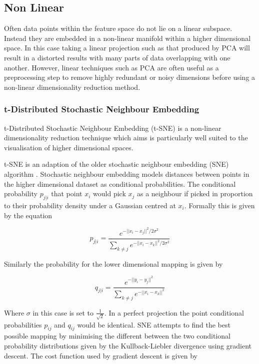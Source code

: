 \subsection{Non Linear}
Often data points within the feature space do not lie on a linear subspace. Instead they are embedded in a non-linear manifold within a higher dimensional space. In this case taking a linear projection such as that produced by PCA will result in a distorted results with many parts of data overlapping with one another. However, linear techniques such as PCA are often useful as a preprocessing step to remove highly redundant or noisy dimensions before using a non-linear dimensionality reduction method.

\subsubsection{t-Distributed Stochastic Neighbour Embedding}
t-Distributed Stochastic Neighbour Embedding (t-SNE) \cite{van2008visualizing} is a non-linear dimensionality reduction technique which aims is particularly well suited to the visualisation of higher dimensional spaces. 

t-SNE is an adaption of the older stochastic neighbour embedding (SNE) algorithm \cite{hinton2002stochastic}. Stochastic neighbour embedding models distances between points in the higher dimensional dataset as conditional probabilities. The conditional probability $p_{j|i}$ that point $x_i$ would pick $x_j$ as a neighbour if picked in proportion to their probability density under a Gaussian centred at $x_i$. Formally this is given by the equation

\begin{equation}
	p_{j|i} = \frac{e^{-||x_i - x_j ||^2 / 2\sigma^2}}{\sum_{k\neq j} e^{-||x_i - x_k ||^2 / 2\sigma^2}}
\end{equation}

Similarly the probability for the lower dimensional mapping is given by

\begin{equation}
	q_{j|i} = \frac{e^{-||y_i - y_j ||^2}}{\sum_{k\neq j} e^{-||x_i - x_k ||^2}}
\end{equation}

Where $\sigma$ in this case is set to $\frac{1}{\sqrt{2}}$. In a perfect projection the point conditional probabilities $p_{ij}$ and $q_{ij}$ would be identical. SNE attempts to find the best possible mapping by minimising the different between the two conditional probability distributions given by the Kullback-Liebler divergence using gradient descent. The cost function used by gradient descent is given by


